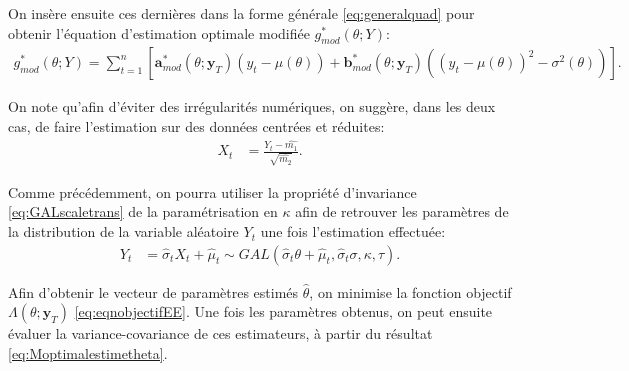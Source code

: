 On insère ensuite ces dernières dans la forme générale
\eqref{eq:generalquad} pour obtenir l'équation d'estimation optimale
modifiée $g_{mod}^{*}\left(\theta;Y \right)$:
\begin{align}
  \label{eq:generalquadmod}
  g_{mod}^{*}\left(\theta;Y \right) = \sum_{t=1}^n \left[
    \mathbf{a}_{mod}^{*}(\theta;\mathbf{y}_T)(y_t-\mu\left(\theta\right)) +
    \mathbf{b}_{mod}^{*}(\theta;\mathbf{y}_T)\left((y_t-\mu\left(\theta\right))^2-\sigma^2\left(\theta\right)
    \right)\right].
\end{align}

On note qu'afin d'éviter des irrégularités numériques, on suggère,
dans les deux cas, de faire l'estimation sur des données centrées et
réduites:
\begin{align}
  X_t &=
  \frac{Y_t-\hat{m_1}}{\sqrt{\hat{m_2}}}. \label{eq:defcentrereduite}
\end{align}

Comme précédemment, on pourra utiliser la propriété d'invariance
\eqref{eq:GALscaletrans} de la paramétrisation en $\kappa$ afin de
retrouver les paramètres de la distribution de la variable aléatoire
$Y_t$ une fois l'estimation effectuée:
\begin{align}
  Y_t &= \hat{\sigma}_{t} X_t + \hat{\mu}_{t} \sim
  GAL(\hat{\sigma}_{t} \theta +
  \hat{\mu}_{t},\hat{\sigma}_{t}\sigma,\kappa,\tau). \label{eq:paramnonreduit}
\end{align}

Afin d'obtenir le vecteur de paramètres estimés $\hat\theta$, on
minimise la fonction objectif
$\Lambda\left(\theta;\mathbf{y}_T\right)$
\eqref{eq:eqnobjectifEE}. Une fois les paramètres obtenus, on peut
ensuite évaluer la variance-covariance de ces estimateurs, à partir du
résultat \eqref{eq:Moptimalestimetheta}.

